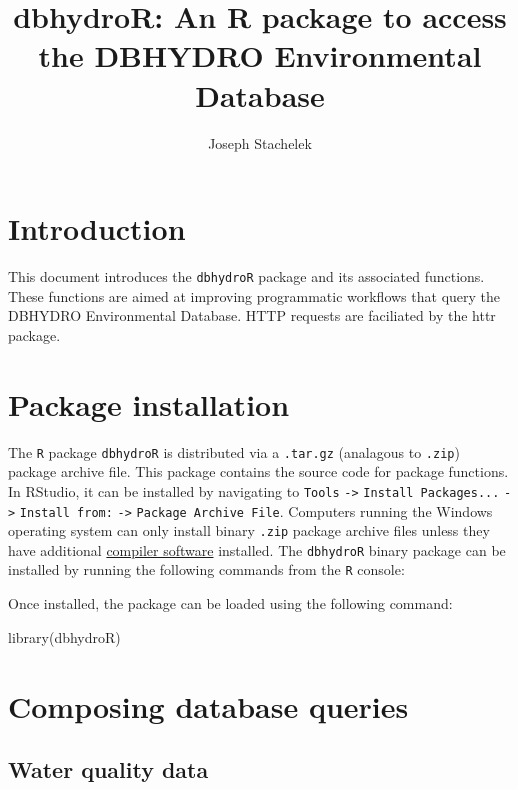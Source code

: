 \documentclass[12pt,notitlepage]{article}
\author{Joseph Stachelek}
\title{dbhydroR: An R package to access the DBHYDRO Environmental Database}
\begin{document}

\maketitle
 


\section{Introduction}

This document introduces the \texttt{dbhydroR} package and its associated functions. These functions are aimed at improving programmatic workflows that query the DBHYDRO Environmental Database. HTTP requests are faciliated by the httr \citep{httr} package. 

\section{Package installation}

The \texttt{R} package \texttt{dbhydroR} is distributed via a \texttt{.tar.gz} (analagous to \texttt{.zip}) package archive file. This package contains the source code for package functions. In RStudio, it can be installed by navigating to \texttt{Tools} \verb|->| \texttt{Install Packages...} \verb|->| \texttt{Install from:} \verb|->| \texttt{Package Archive File}. Computers running the Windows operating system can only install binary \texttt{.zip} package archive files unless they have additional \href{https://cran.r-project.org/bin/windows/Rtools/}{compiler software} installed. The \texttt{dbhydroR} binary package can be installed by running the following commands from the \texttt{R} console:

\vspace{10pt}

\noindent Once installed, the package can be loaded using the following command:


\begin{Schunk}
\begin{Sinput}
 library(dbhydroR)
\end{Sinput}
\end{Schunk}


\section{Composing database queries}
\subsection{Water quality data}
\end{document}
